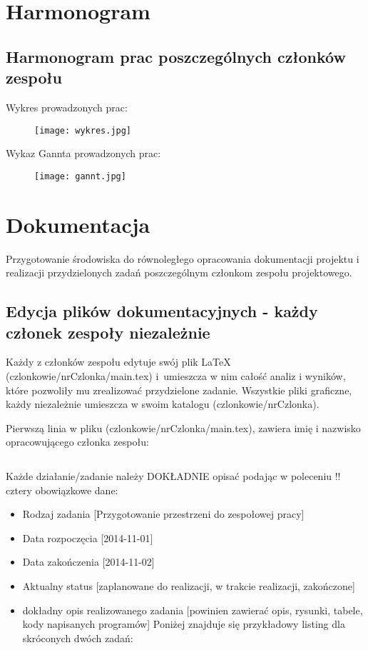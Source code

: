 \section{Harmonogram}
\subsection{Harmonogram prac poszczególnych członków zespołu}
Wykres prowadzonych prac:
\begin{figure}[h]
\centering
\texttt{[image: wykres.jpg]}
\end{figure}

Wykaz Gannta prowadzonych prac:
\begin{figure}[h]
\centering
\texttt{[image: gannt.jpg]}
\end{figure}


\section{Dokumentacja}
Przygotowanie środowiska do równoległego opracowania dokumentacji projektu i realizacji przydzielonych zadań poszczególnym członkom zespołu projektowego.

\subsection[Edycja plików dokumentacyjnych]{Edycja plików dokumentacyjnych - każdy członek zespoły niezależnie}
Każdy z członków zespołu edytuje swój plik \LaTeX{} (czlonkowie/nrCzlonka/main.tex) i~umieszcza w nim całość analiz i wyników, które pozwoliły mu zrealizować przydzielone zadanie. Wszystkie pliki graficzne, każdy niezależnie umieszcza w swoim katalogu (czlonkowie/nrCzlonka).

Pierwszą linia w pliku (czlonkowie/nrCzlonka/main.tex), zawiera imię i nazwisko opracowującego członka zespołu:
\begin{lstlisting}
\end{lstlisting}

Każde działanie/zadanie należy DOKŁADNIE opisać podając w poleceniu \s!\zadanieprojektowe! cztery obowiązkowe dane:
\begin{itemize}
\item Rodzaj zadania [Przygotowanie przestrzeni do zespołowej pracy]
\item Data rozpoczęcia [2014-11-01]
\item Data zakończenia [2014-11-02]
\item Aktualny status [zaplanowane do realizacji, w trakcie realizacji, zakończone]
\item dokładny opis realizowanego zadania [powinien zawierać opis, rysunki, tabele, kody napisanych programów]
Poniżej znajduje się przykładowy listing dla skróconych dwóch zadań: 
\end{itemize}


